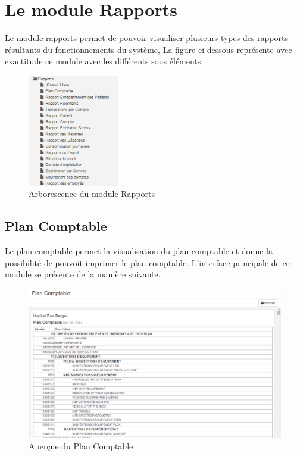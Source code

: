 \documentclass[12pt,a4paper]{report}
\begin{document}
\newpage
\chapter{Le module Rapports}        
Le module rapports permet de pouvoir visualiser plusieurs types des rapports résultants du fonctionnements du système, La figure ci-dessous représente avec exactitude ce module avec les différents sous éléments.

\begin{figure}[h]
\begin{center}
\includegraphics[width=4cm]{pic/ArboReport.png}
\end{center}
\caption{Arborescence du module Rapports}
\label{Arborescence du module Rapports}
\end{figure}
\newpage
\section{Plan Comptable}
Le plan comptable permet la visualisation du plan comptable et donne la possibilité de pouvoit imprimer le plan comptable. L'interface principale de ce module se présente de la manière suivante. 

\begin{figure}[h]
\begin{center}
\includegraphics[width=14cm]{pic/PlanComptableAf.png}
\end{center}
\caption{Aperçue du Plan Comptable}
\label{Aperçue du Plan Comptable}
\end{figure}
\end{document}
